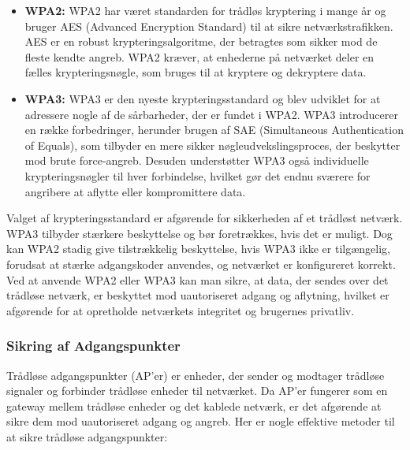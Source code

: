 \begin{itemize}
	\item \textbf{WPA2:} WPA2 har været standarden for trådløs kryptering i mange år og bruger AES (Advanced Encryption Standard) til at sikre netværkstrafikken. AES er en robust krypteringsalgoritme, der betragtes som sikker mod de fleste kendte angreb. WPA2 kræver, at enhederne på netværket deler en fælles krypteringsnøgle, som bruges til at kryptere og dekryptere data.
	
	\item \textbf{WPA3:} WPA3 er den nyeste krypteringsstandard og blev udviklet for at adressere nogle af de sårbarheder, der er fundet i WPA2. WPA3 introducerer en række forbedringer, herunder brugen af SAE (Simultaneous Authentication of Equals), som tilbyder en mere sikker nøgleudvekslingsproces, der beskytter mod brute force-angreb. Desuden understøtter WPA3 også individuelle krypteringsnøgler til hver forbindelse, hvilket gør det endnu sværere for angribere at aflytte eller kompromittere data.
\end{itemize}

Valget af krypteringsstandard er afgørende for sikkerheden af et trådløst netværk. WPA3 tilbyder stærkere beskyttelse og bør foretrækkes, hvis det er muligt. Dog kan WPA2 stadig give tilstrækkelig beskyttelse, hvis WPA3 ikke er tilgængelig, forudsat at stærke adgangskoder anvendes, og netværket er konfigureret korrekt.
\newline\newline\noindent
Ved at anvende WPA2 eller WPA3 kan man sikre, at data, der sendes over det trådløse netværk, er beskyttet mod uautoriseret adgang og aflytning, hvilket er afgørende for at opretholde netværkets integritet og brugernes privatliv.


\subsubsection{Sikring af Adgangspunkter}
Trådløse adgangspunkter (AP'er) er enheder, der sender og modtager trådløse signaler og forbinder trådløse enheder til netværket. Da AP'er fungerer som en gateway mellem trådløse enheder og det kablede netværk, er det afgørende at sikre dem mod uautoriseret adgang og angreb. Her er nogle effektive metoder til at sikre trådløse adgangspunkter:

